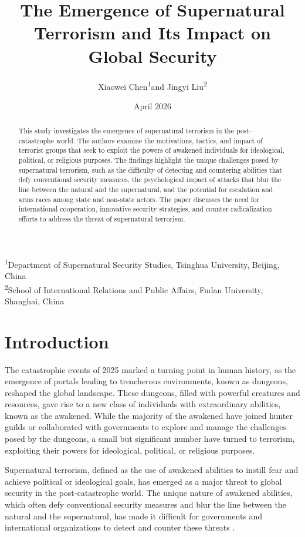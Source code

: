 \documentclass[12pt, a4paper]{article}
\title{The Emergence of Supernatural Terrorism and Its Impact on Global Security}
\author{Xiaowei Chen\textsuperscript{1}and Jingyi Liu\textsuperscript{2}}
\date{April 2026}
\begin{document}
\maketitle

 \textsuperscript{1}Department of Supernatural Security Studies, Tsinghua University, Beijing, China\\
 \textsuperscript{2}School of International Relations and Public Affairs, Fudan University, Shanghai, China

\begin{abstract}
This study investigates the emergence of supernatural terrorism in the post-catastrophe world. The authors examine the motivations, tactics, and impact of terrorist groups that seek to exploit the powers of awakened individuals for ideological, political, or religious purposes. The findings highlight the unique challenges posed by supernatural terrorism, such as the difficulty of detecting and countering abilities that defy conventional security measures, the psychological impact of attacks that blur the line between the natural and the supernatural, and the potential for escalation and arms races among state and non-state actors. The paper discusses the need for international cooperation, innovative security strategies, and counter-radicalization efforts to address the threat of supernatural terrorism.
\end{abstract}

\section{Introduction}
The catastrophic events of 2025 marked a turning point in human history, as the emergence of portals leading to treacherous environments, known as dungeons, reshaped the global landscape. These dungeons, filled with powerful creatures and resources, gave rise to a new class of individuals with extraordinary abilities, known as the awakened. While the majority of the awakened have joined hunter guilds or collaborated with governments to explore and manage the challenges posed by the dungeons, a small but significant number have turned to terrorism, exploiting their powers for ideological, political, or religious purposes.

Supernatural terrorism, defined as the use of awakened abilities to instill fear and achieve political or ideological goals, has emerged as a major threat to global security in the post-catastrophe world. The unique nature of awakened abilities, which often defy conventional security measures and blur the line between the natural and the supernatural, has made it difficult for governments and international organizations to detect and counter these threats \citep{Hoffman2026}.
\end{document}
